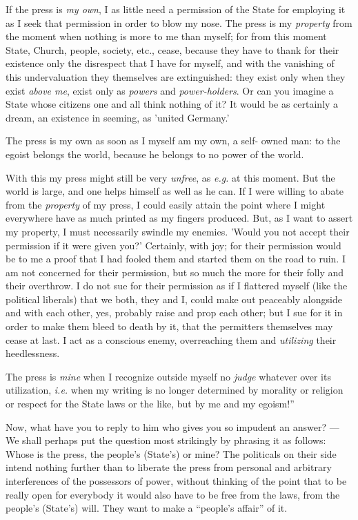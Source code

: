If the press is \textit{my own}, I as little need a permission of the State 
for employing it as I seek that permission in order to blow my nose. The press 
is my \textit{property} from the moment when nothing is more to me than 
myself; for from this moment State, Church, people, society, etc., cease, 
because they have to thank for their existence only the disrespect that I have 
for myself, and with the vanishing of this undervaluation they themselves are 
extinguished: they exist only when they exist \textit{above me}, exist only as 
\textit{powers} and \textit{power-holders}. Or can you imagine a State whose 
citizens one and all think nothing of it? It would be as certainly a dream, an 
existence in seeming, as 'united Germany.'

The press is my own as soon as I myself am my own, a self- owned man: to the 
egoist belongs the world, because he belongs to no power of the world.

With this my press might still be very \textit{unfree}, as \textit{e.g.} at 
this moment. But the world is large, and one helps himself as well as he can. 
If I were willing to abate from the \textit{property} of my press, I could 
easily attain the point where I might everywhere have as much printed as my 
fingers produced. But, as I want to assert my property, I must necessarily 
swindle my enemies. 'Would you not accept their permission if it were given 
you?' Certainly, with joy; for their permission would be to me a proof that I 
had fooled them and started them on the road to ruin. I am not concerned for 
their permission, but so much the more for their folly and their overthrow. I 
do not sue for their permission as if I flattered myself (like the political 
liberals) that we both, they and I, could make out peaceably alongside and 
with each other, yes, probably raise and prop each other; but I sue for it in 
order to make them bleed to death by it, that the permitters themselves may 
cease at last. I act as a conscious enemy, overreaching them and 
\textit{utilizing} their heedlessness.

The press is \textit{mine} when I recognize outside myself no \textit{judge} 
whatever over its utilization, \textit{i.e.} when my writing is no longer 
determined by morality or religion or respect for the State laws or the like, 
but by me and my egoism!''

Now, what have you to reply to him who gives you so impudent an answer? --- We 
shall perhaps put the question most strikingly by phrasing it as follows: 
Whose is the press, the people's (State's) or mine? The politicals on their 
side intend nothing further than to liberate the press from personal and 
arbitrary interferences of the possessors of power, without thinking of the 
point that to be really open for everybody it would also have to be free from 
the laws, from the people's (State's) will. They want to make a ``people's 
affair'' of it.

